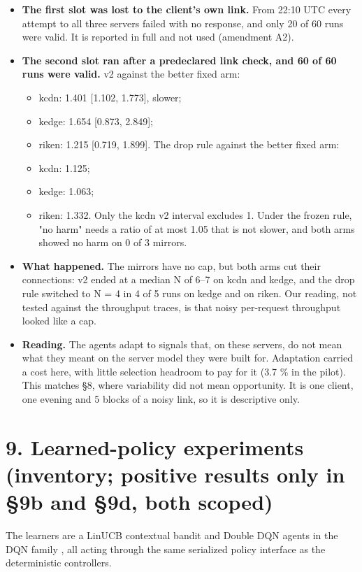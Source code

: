 \documentclass{ieeeaccess}
\begin{document}
\begin{itemize}
\item \textbf{The first slot was lost to the client's own link.} From 22:10 UTC every attempt to all three servers failed with no response, and only 20 of 60 runs were valid. It is reported in full and not used (amendment A2).
\item \textbf{The second slot ran after a predeclared link check, and 60 of 60 runs were valid.} v2 against the better fixed arm:
\begin{itemize}
\item kcdn: 1.401 [1.102, 1.773], slower;
\item kedge: 1.654 [0.873, 2.849];
\item riken: 1.215 [0.719, 1.899]. The drop rule against the better fixed arm:
\item kcdn: 1.125;
\item kedge: 1.063;
\item riken: 1.332. Only the kcdn v2 interval excludes 1. Under the frozen rule, "no harm" needs a ratio of at most 1.05 that is not slower, and both arms showed no harm on 0 of 3 mirrors.
\end{itemize}
\item \textbf{What happened.} The mirrors have no cap, but both arms cut their connections: v2 ended at a median N of 6–7 on kcdn and kedge, and the drop rule switched to N = 4 in 4 of 5 runs on kedge and on riken. Our reading, not tested against the throughput traces, is that noisy per-request throughput looked like a cap.
\item \textbf{Reading.} The agents adapt to signals that, on these servers, do not mean what they meant on the server model they were built for. Adaptation carried a cost here, with little selection headroom to pay for it (3.7 \% in the pilot). This matches §8, where variability did not mean opportunity. It is one client, one evening and 5 blocks of a noisy link, so it is descriptive only.
\end{itemize}

\section*{9. Learned-policy experiments (inventory; positive results only in §9b and §9d, both scoped)}

The learners are a LinUCB contextual bandit \cite{li2010linucb} and Double DQN \cite{vanhasselt2016ddqn} agents in the DQN family \cite{mnih2015dqn}, all acting through the same serialized policy interface as the deterministic controllers.
\end{document}
